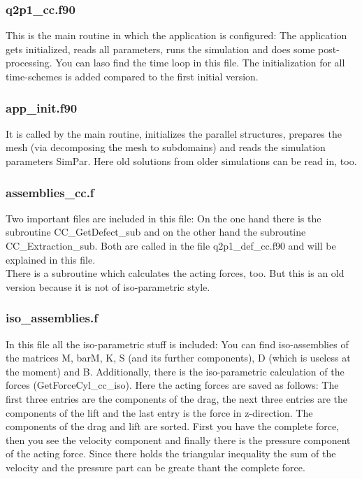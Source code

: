 \subsubsection*{q2p1\_cc.f90} 
This is the main routine in which the application is configured: The application gets initialized, reads all parameters, runs the simulation and does some post-processing. You can laso find the time loop in this file. The initialization for all time-schemes is added compared to the first initial version.

\subsubsection*{app\_init.f90} 
It is called by the main routine, initializes the parallel structures, prepares the mesh (via decomposing the mesh to subdomains) and reads the simulation parameters SimPar. Here old solutions from older simulations can be read in, too.

\subsubsection*{assemblies\_cc.f}
Two important files are included in this file: On the one hand there is the subroutine CC\_GetDefect\_sub and on the other hand the subroutine CC\_Extraction\_sub. Both are called in the file q2p1\_def\_cc.f90 and will be explained in this file.\\
There is a subroutine which calculates the acting forces, too. But this is an old version because it is not of iso-parametric style.

\subsubsection*{iso\_assemblies.f} 
In this file all the iso-parametric stuff is included: You can find iso-assemblies of the matrices M, barM, K, S (and its further components), D (which is useless at the moment) and B. Additionally, there is the iso-parametric calculation of the forces (GetForceCyl\_cc\_iso). Here the acting forces are saved as follows: The first three entries are the components of the drag, the next three entries are the components of the lift and the last entry is the force in z-direction. The components of the drag and lift are sorted. First you have the complete force, then you see the velocity component and finally there is the pressure component of the acting force. Since there holds the triangular inequality the sum of the velocity and the pressure part can be greate thant the complete force.

